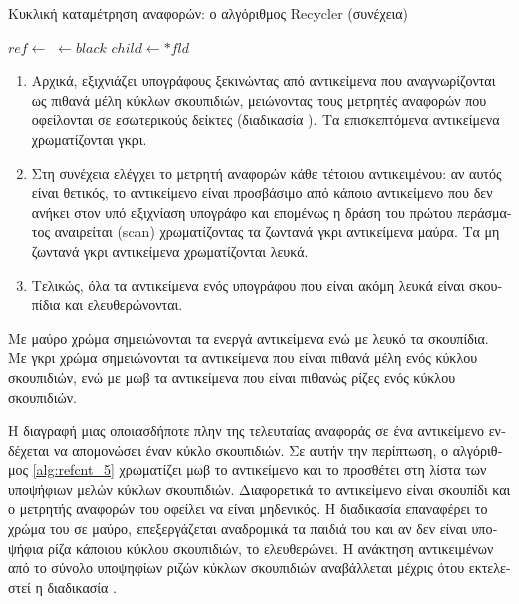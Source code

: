 \begin{greek}
\begin{algorithm}
  \ContinuedFloat
  \caption{Κυκλική καταμέτρηση αναφορών: ο αλγόριθμος Recycler (συνέχεια)}
  \begin{algorithmic}
        \State $ref \gets$ 
        \State {}
      \EndWhile
    \EndProcedure
    \Statex
        \State {} $\gets black$ 
          \State $child \gets *fld$
            \State {}
          \EndIf
        \EndFor
        \State {}
     \EndIf
   \EndProcedure
  \end{algorithmic}
\end{algorithm}

\begin{enumerate}
  \item Αρχικά, εξιχνιάζει υπογράφους ξεκινώντας από αντικείμενα
    που αναγνωρίζονται ως πιθανά μέλη κύκλων σκουπιδιών,
    μειώνοντας τους μετρητές αναφορών που οφείλονται σε
    εσωτερικούς δείκτες (διαδικασία ).
    Τα επισκεπτόμενα αντικείμενα χρωματίζονται γκρι.
  \item Στη συνέχεια ελέγχει το μετρητή αναφορών κάθε τέτοιου
    αντικειμένου: αν αυτός είναι θετικός, το αντικείμενο είναι
    προσβάσιμο από κάποιο αντικείμενο που δεν ανήκει στον υπό
    εξιχνίαση υπογράφο και επομένως η δράση του πρώτου περάσματος
    αναιρείται (scan) χρωματίζοντας τα ζωντανά γκρι αντικείμενα
    μαύρα. Τα μη ζωντανά γκρι αντικείμενα χρωματίζονται λευκά.
  \item Τελικώς, όλα τα αντικείμενα ενός υπογράφου που είναι
    ακόμη λευκά είναι σκουπίδια και ελευθερώνονται.
\end{enumerate}

Με μαύρο χρώμα σημειώνονται τα ενεργά αντικείμενα ενώ με
λευκό τα σκουπίδια. Με γκρι χρώμα σημειώνονται τα αντικείμενα
που είναι πιθανά μέλη ενός κύκλου σκουπιδιών, ενώ με μωβ τα
αντικείμενα που είναι πιθανώς ρίζες ενός κύκλου σκουπιδιών.

Η διαγραφή μιας οποιασδήποτε πλην της τελευταίας αναφοράς σε
ένα αντικείμενο ενδέχεται να απομονώσει έναν κύκλο σκουπιδιών.
Σε αυτήν την περίπτωση, ο αλγόριθμος \ref{alg:refcnt_5}
χρωματίζει μωβ το αντικείμενο και το προσθέτει στη λίστα των
υποψήφιων μελών κύκλων σκουπιδιών. Διαφορετικά το αντικείμενο
είναι σκουπίδι και ο μετρητής αναφορών του οφείλει να είναι
μηδενικός. Η διαδικασία  επαναφέρει το χρώμα
του σε μαύρο, επεξεργάζεται αναδρομικά τα παιδιά του και αν
δεν είναι υποψήφια ρίζα κάποιου κύκλου σκουπιδιών, το
ελευθερώνει. Η ανάκτηση αντικειμένων από το σύνολο υποψηφίων
ριζών κύκλων σκουπιδιών αναβάλλεται μέχρις ότου εκτελεστεί
η διαδικασία . 


\end{greek}
